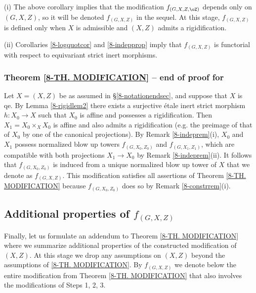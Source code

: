 \documentclass[10pt]{../fichiers-configuration-latex/smfart}
\begin{document}
\begin{remark2}\label{8-indeprem} (i) The above corollary implies
that the modification $f_{(G,X,Z,\oZ)}$ depends only on $(G,X,Z)$,
so it will be denoted $f_{(G,X,Z)}$ in the sequel. At this stage,
$f_{(G,X,Z)}$ is defined only when $X$ is admissible and $(X,Z)$
admits a rigidification.

(ii) Corollaries \ref{8-logquotcor} and \ref{8-indepprop} imply
that $f_{(G,X,Z)}$ is functorial with respect to equivariant strict
inert morphisms.  \end{remark2}

\subsubsection{Theorem \ref{8-TH. MODIFICATION} -- end of proof
for}\label{8-endproofsec} Let $X=(X,Z)$ be as assumed in
\S\ref{8-notationendsec}, and suppose that $X$ is qe. By Lemma
\ref{8-rigidlem2} there exists a surjective \'etale inert strict
morphism $h{\colon}X_0\to X$ such that $X_0$ is affine and possesses
a rigidification. Then $X_1=X_0\times_XX_0$ is affine and also
admits a rigidification (e.g. the preimage of that of $X_0$ by
one of the canonical projections). By Remark \ref{8-indeprem}(i),
$X_0$ and $X_1$ possess normalized blow up towers $f_{(G,X_0,Z_0)}$
and $f_{(G,X_1,Z_1)}$, which are  compatible with both projections
$X_1\to X_0$ by Remark \ref{8-indeprem}(ii). It follows that
$f_{(G,X_0,Z_0)}$ is induced from a unique normalized blow up
tower of $X$ that we denote as $f_{(G,X,Z)}$. This modification
satisfies all assertions of Theorem \ref{8-TH. MODIFICATION}
because $f_{(G,X_0,Z_0)}$ does so by Remark \ref{8-constrrem}(i).

\subsection{Additional properties of $f_{(G,X,Z)}$}\label{8-addsec}
Finally, let us formulate an addendum to Theorem
\ref{8-TH. MODIFICATION} where we summarize additional properties
of the constructed modification of $(X,Z)$. At this stage
we drop any assumptions on $(X,Z)$ beyond the assumptions of
\ref{8-TH. MODIFICATION}. By $f_{(G,X,Z)}$ we denote below the
entire modification from Theorem \ref{8-TH. MODIFICATION} that also
involves the modifications of Steps 1, 2, 3.
\end{document}
